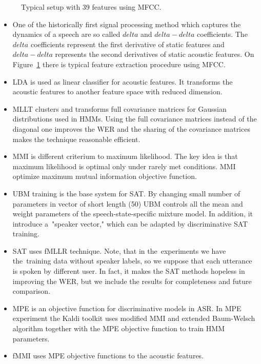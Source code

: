 \begin{figure}
    \begin{center}
    
    \caption{Typical setup with 39 features using \ac{MFCC}.}
    \label{fig:delta} 
    \end{center}
\end{figure}

\begin{itemize}
    \item One of the historically first signal processing method which captures the dynamics of a speech
        are so called $delta$ and $delta-delta$ coefficients. The~$delta$ coefficients represent the first 
        derivative of static features and $delta-delta$ represents the second derivatives of static acoustic features.
        On Figure~\ref{fig:delta} there is typical feature extraction procedure using \ac{MFCC}\cite{ye2004speech}.
    \item \ac{LDA} is used as linear classifier for acoustic features. 
        It transforms the acoustic features to another feature space with reduced dimension.
    \item \ac{MLLT}\cite{psutka2007benefit} clusters and transforms full covariance matrices for Gaussian distributions used in \ac{HMM}s. Using the full covariance matrices instead of the diagonal one improves the \ac{WER} and the sharing of the covariance matrices makes the technique reasonable efficient.
    \item \ac{MMI} is different criterium to maximum likelihood. The key idea is that maximum likelihood is optimal only under rarely met conditions. \ac{MMI} optimize maximum mutual information objective function\cite{chow1990maximum}.
    \item \ac{UBM}\cite{povey2010subspace} training is the base system for \acl{SAT}. 
        By changing small number of parameters in vector of short length (50) \ac{UBM} controls all the mean and 
        weight parameters of the speech-state-specific mixture model. In addition, it introduce 
        a~"speaker vector," which can be adapted by discriminative \ac{SAT} training.
    \item \acl{SAT}\cite{povey2011kaldi} uses \ac{fMLLR} technique. Note, that in the~experiments we have 
        the~training data without speaker labels, so we suppose that each utterance is spoken by different user.
        In fact, it makes the \ac{SAT} methods hopeless in improving the \ac{WER}, 
        but we include the results for completeness and future comparison.
    \item \ac{MPE}\cite{povey2007evaluation} is an objective function for discriminative models in \ac{ASR}. In \ac{MPE} experiment the Kaldi toolkit uses modified \ac{MMI} and extended Baum-Welsch algorithm together with the \ac{MPE} objective function to train \ac{HMM} parameters.
    \item \cite{povey2005fmpe} \ac{fMMI} uses \ac{MPE} objective functions to the acoustic features.
\end{itemize}
